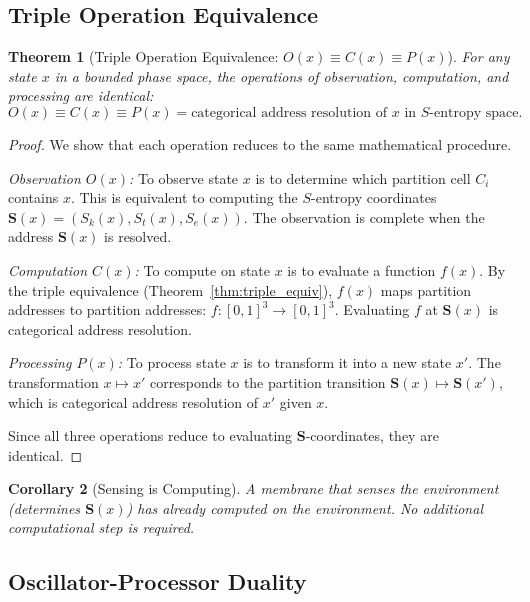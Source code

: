 \documentclass[twocolumn,10pt]{article}
\newtheorem{theorem}{Theorem}[section]
\newtheorem{corollary}[theorem]{Corollary}
\theoremstyle{definition}
\theoremstyle{remark}
\newcommand{\Sk}{S_k}
\newcommand{\St}{S_t}
\newcommand{\Se}{S_e}
\begin{document}
\subsection{Triple Operation Equivalence}

\begin{theorem}[Triple Operation Equivalence: $O(x) \equiv C(x) \equiv P(x)$]
\label{thm:ocp}
For any state $x$ in a bounded phase space, the operations of observation, computation, and processing are identical:
\begin{equation}
  O(x) \equiv C(x) \equiv P(x) = \text{categorical address resolution of } x \text{ in } S\text{-entropy space}.
  \label{eq:ocp}
\end{equation}
\end{theorem}

\begin{proof}
We show that each operation reduces to the same mathematical procedure.

\emph{Observation $O(x)$:} To observe state $x$ is to determine which partition cell $C_i$ contains $x$. This is equivalent to computing the $S$-entropy coordinates $\mathbf{S}(x) = (\Sk(x), \St(x), \Se(x))$. The observation is complete when the address $\mathbf{S}(x)$ is resolved.

\emph{Computation $C(x)$:} To compute on state $x$ is to evaluate a function $f(x)$. By the triple equivalence (Theorem~\ref{thm:triple_equiv}), $f(x)$ maps partition addresses to partition addresses: $f: [0,1]^3 \to [0,1]^3$. Evaluating $f$ at $\mathbf{S}(x)$ is categorical address resolution.

\emph{Processing $P(x)$:} To process state $x$ is to transform it into a new state $x'$. The transformation $x \mapsto x'$ corresponds to the partition transition $\mathbf{S}(x) \mapsto \mathbf{S}(x')$, which is categorical address resolution of $x'$ given $x$.

Since all three operations reduce to evaluating $\mathbf{S}$-coordinates, they are identical.
\end{proof}

\begin{corollary}[Sensing is Computing]
\label{cor:sensing_computing}
A membrane that senses the environment (determines $\mathbf{S}(x)$) has already computed on the environment. No additional computational step is required.
\end{corollary}

\subsection{Oscillator-Processor Duality}
\end{document}
